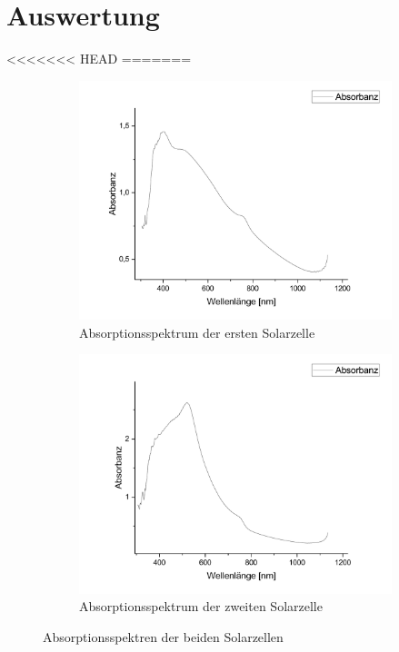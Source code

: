 \documentclass[12pt,a4paper,ngerman]{report}
\begin{document}
		

\chapter{Auswertung}
<<<<<<< HEAD
=======
	\begin{figure}[ht]
		\centering
		\begin{subfigure}[b]{0.45\textwidth}
			\centering
			\includegraphics[width=\textwidth]{bilder/AbsP1.pdf}
			\caption{Absorptionsspektrum der ersten Solarzelle}
			\label{fig:AbsP1}
		\end{subfigure}
		\hfill
		\begin{subfigure}[b]{0.45\textwidth}
			\centering
			\includegraphics[width=\textwidth]{bilder/AbsP2.pdf}
			\caption{Absorptionsspektrum der zweiten Solarzelle}
			\label{fig:AbsP2}
		\end{subfigure}
		\caption{Absorptionsspektren der beiden Solarzellen}
		\label{fig:AbsP1P2Combined}
	\end{figure}
\end{document}
